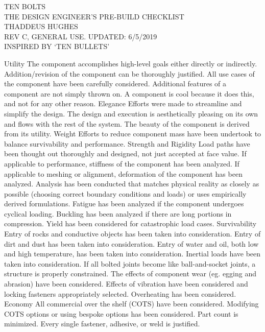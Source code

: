 \documentclass[letterpaper]{article}
\begin{document}
\selectfont
{\large
TEN BOLTS \\
THE DESIGN ENGINEER'S PRE-BUILD CHECKLIST \\
THADDEUS HUGHES \\
REV C, GENERAL USE. UPDATED: 6/5/2019 \\
INSPIRED BY `TEN BULLETS' }

\begin{outline}
\1 Utility
	\2 The component accomplishes high-level goals either directly or indirectly. Addition/revision of the component can be thoroughly justified.
	\2 All use cases of the component have been carefully considered. Additional features of a component are not simply thrown on.
	\2 A component is cool because it does this, and not for any other reason.
\1 Elegance
	\2 Efforts were made to streamline and simplify the design.
	\2 The design and execution is aesthetically pleasing on its own and flows with the rest of the system.
	\2 The beauty of the component is derived from its utility.
\1 Weight
	\2 Efforts to reduce component mass have been undertook to balance survivability and performance.
\1 Strength and Rigidity
	\2 Load paths have been thought out thoroughly and designed, not just accepted at face value.
	\2 If applicable to performance, stiffness of the component has been analyzed.
	\2 If applicable to meshing or alignment, deformation of the component has been analyzed.
	\2 Analysis has been conducted that matches physical reality as closely as possible (choosing correct boundary conditions and loads) or uses empirically derived formulations.
	\2 Fatigue has been analyzed if the component undergoes cyclical loading.
	\2 Buckling has been analyzed if there are long portions in compression.
	\2 Yield has been considered for catastrophic load cases.
\1 Survivability
	\2 Entry of rocks and conductive objects has been taken into consideration.
	\2 Entry of dirt and dust has been taken into consideration.
	\2 Entry of water and oil, both low and high temperature, has been taken into consideration.
	\2 Inertial loads have been taken into consideration.
	\2 If all bolted joints become like ball-and-socket joints, a structure is properly constrained.
	\2 The effects of component wear (eg. egging and abrasion) have been considered.
	\2 Effects of vibration have been considered and locking fasteners appropriately selected.
	\2 Overheating has been considered.
\1 Economy
	\2 All commercial over the shelf (COTS) have been considered.
	\2 Modifying COTS options or using bespoke options has been considered.
	\2 Part count is minimized. Every single fastener, adhesive, or weld is justified.

\end{outline}
\end{document}
